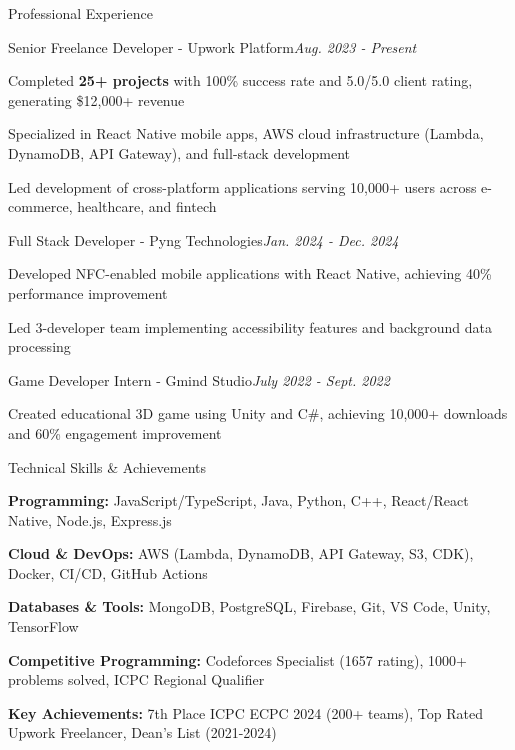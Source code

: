 \documentclass{resume}
\begin{document}
\begin{rSection}{Professional Experience}
\vspace{-0.1in}
\begin{rSubsection}{Senior Freelance Developer - Upwork Platform}{\em Aug. 2023 - Present}{}{}
\item Completed {\bf 25+ projects} with 100\% success rate and 5.0/5.0 client rating, generating \$12,000+ revenue
\item Specialized in React Native mobile apps, AWS cloud infrastructure (Lambda, DynamoDB, API Gateway), and full-stack development
\item Led development of cross-platform applications serving 10,000+ users across e-commerce, healthcare, and fintech
\end{rSubsection}

\vspace{-0.05in}
\begin{rSubsection}{Full Stack Developer - Pyng Technologies}{\em Jan. 2024 - Dec. 2024}{}{}
\item Developed NFC-enabled mobile applications with React Native, achieving 40\% performance improvement
\item Led 3-developer team implementing accessibility features and background data processing
\end{rSubsection}

\vspace{-0.05in}
\begin{rSubsection}{Game Developer Intern - Gmind Studio}{\em July 2022 - Sept. 2022}{}{}
\item Created educational 3D game using Unity and C\#, achieving 10,000+ downloads and 60\% engagement improvement
\end{rSubsection}
\end{rSection}


\begin{rSection}{Technical Skills \& Achievements}
\vspace{-0.1in}
\begin{rSubsection}{}{}{}{}
\item {\bf Programming:} JavaScript/TypeScript, Java, Python, C++, React/React Native, Node.js, Express.js
\item {\bf Cloud \& DevOps:} AWS (Lambda, DynamoDB, API Gateway, S3, CDK), Docker, CI/CD, GitHub Actions
\item {\bf Databases \& Tools:} MongoDB, PostgreSQL, Firebase, Git, VS Code, Unity, TensorFlow
\item {\bf Competitive Programming:} Codeforces Specialist (1657 rating), 1000+ problems solved, ICPC Regional Qualifier
\item {\bf Key Achievements:} 7th Place ICPC ECPC 2024 (200+ teams), Top Rated Upwork Freelancer, Dean's List (2021-2024)
\end{rSubsection}
\end{rSection}
\end{document}
